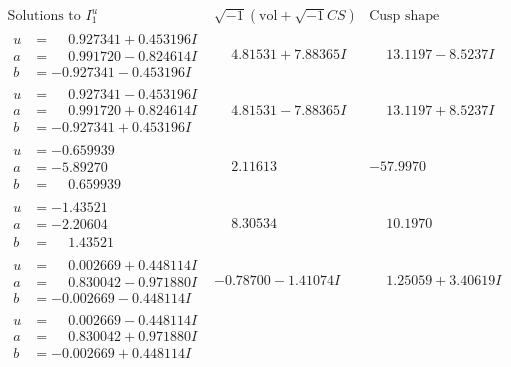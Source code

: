 \documentclass[1p]{elsarticle_modified}
\theoremstyle{definition}
\newcommand{\I}{\sqrt{-1}}
\begin{document}
$$\begin{array}{c|c|c}  
\text{Solutions to }I^u_{1}& \I (\text{vol} + \sqrt{-1}CS) & \text{Cusp shape}\\
 \hline 
\begin{aligned}
u &= \phantom{-}0.927341 + 0.453196 I \\
a &= \phantom{-}0.991720 - 0.824614 I \\
b &= -0.927341 - 0.453196 I\end{aligned}
 & \phantom{-}4.81531 + 7.88365 I & \phantom{-}13.1197 - 8.5237 I \\ \hline\begin{aligned}
u &= \phantom{-}0.927341 - 0.453196 I \\
a &= \phantom{-}0.991720 + 0.824614 I \\
b &= -0.927341 + 0.453196 I\end{aligned}
 & \phantom{-}4.81531 - 7.88365 I & \phantom{-}13.1197 + 8.5237 I \\ \hline\begin{aligned}
u &= -0.659939\phantom{ +0.000000I} \\
a &= -5.89270\phantom{ +0.000000I} \\
b &= \phantom{-}0.659939\phantom{ +0.000000I}\end{aligned}
 & \phantom{-}2.11613\phantom{ +0.000000I} & -57.9970\phantom{ +0.000000I} \\ \hline\begin{aligned}
u &= -1.43521\phantom{ +0.000000I} \\
a &= -2.20604\phantom{ +0.000000I} \\
b &= \phantom{-}1.43521\phantom{ +0.000000I}\end{aligned}
 & \phantom{-}8.30534\phantom{ +0.000000I} & \phantom{-}10.1970\phantom{ +0.000000I} \\ \hline\begin{aligned}
u &= \phantom{-}0.002669 + 0.448114 I \\
a &= \phantom{-}0.830042 - 0.971880 I \\
b &= -0.002669 - 0.448114 I\end{aligned}
 & -0.78700 - 1.41074 I & \phantom{-}1.25059 + 3.40619 I \\ \hline\begin{aligned}
u &= \phantom{-}0.002669 - 0.448114 I \\
a &= \phantom{-}0.830042 + 0.971880 I \\
b &= -0.002669 + 0.448114 I\end{aligned}

\end{array}$$
\end{document}
